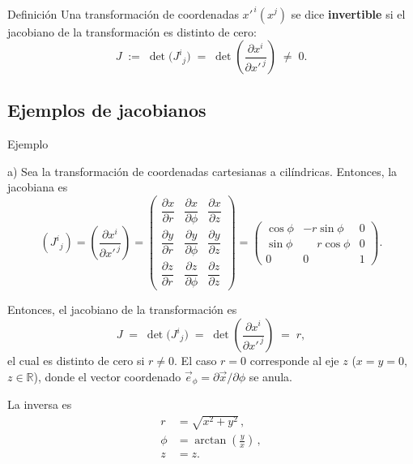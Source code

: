 \documentclass[../apunte_mecanica_clasica.tex]{subfiles}%
\begin{document}
\begin{apuntebloque}{Definición}
 Una transformación de coordenadas $x'^{\,i}(x^{j})$ se dice \textbf{invertible} si el jacobiano de la transformación es distinto de cero:
\begin{equation*}
J \;:=\; \det\!\big(J^{i}{}_{j}\big)
\;=\; \det\!\left(\frac{\partial x^{i}}{\partial x'^{\,j}}\right)
\;\neq\; 0.
\end{equation*}

\end{apuntebloque}


\subsection{Ejemplos de jacobianos}

\begin{apuntebloque}{Ejemplo}

a) Sea la transformación de coordenadas cartesianas a cilíndricas. Entonces, la jacobiana es
\begin{equation*}
\left(J^{i}{}_{j}\right)
=\left(\frac{\partial x^{i}}{\partial x'^{\,j}}\right)
=\begin{pmatrix}
\dfrac{\partial x}{\partial r} & \dfrac{\partial x}{\partial \phi} & \dfrac{\partial x}{\partial z}\\[8pt]
\dfrac{\partial y}{\partial r} & \dfrac{\partial y}{\partial \phi} & \dfrac{\partial y}{\partial z}\\[8pt]
\dfrac{\partial z}{\partial r} & \dfrac{\partial z}{\partial \phi} & \dfrac{\partial z}{\partial z}
\end{pmatrix}
=\begin{pmatrix}
\cos\phi & -r\sin\phi & 0\\
\sin\phi & \phantom{-}r\cos\phi & 0\\
0 & 0 & 1
\end{pmatrix}.
\end{equation*}

Entonces, el jacobiano de la transformación es
\begin{equation*}
J \;=\; \det\!\big(J^{i}{}_{j}\big)
\;=\; \det\!\left(\frac{\partial x^{i}}{\partial x'^{\,j}}\right)
\;=\; r,
\end{equation*}
el cual es distinto de cero si $r\neq 0$. El caso $r=0$ corresponde al eje $z$ ($x=y=0$, $z\in\mathbb{R}$), donde el vector coordenado $\vec{e}_{\phi}=\partial \vec{x}/\partial \phi$ se anula.

La inversa es
\begin{align*}
r &= \sqrt{x^{2}+y^{2}}\,,\\[6pt]
\phi &= \arctan\!\left(\frac{y}{x}\right)\,,\\[6pt]
z &= z.
\end{align*}

\end{apuntebloque}
\end{document}
